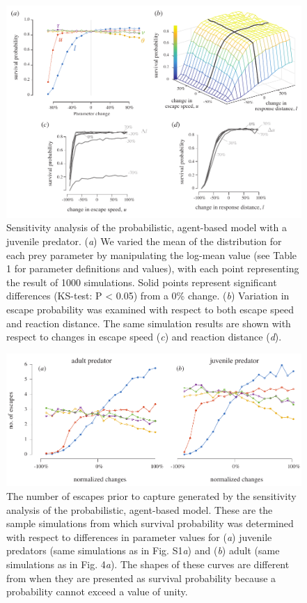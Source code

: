 \documentclass[11pt]{article}
\begin{document}
\linespread{1}\selectfont %


\begin{figure}[!h]
\centering
	\includegraphics[width=5.5in]{supp_sense}
\caption{Sensitivity analysis of the probabilistic, agent-based model with a juvenile predator. 
(\textit{a}) We varied the mean of the distribution for each prey parameter by manipulating the log-mean value (see Table 1 for parameter definitions and values), with each point representing the result of 1000 simulations. 
Solid points represent significant differences (KS-test: P < 0.05) from a 0\% change.
(\textit{b}) Variation in escape probability was examined with respect to both escape speed and reaction distance.
The same simulation results are shown with respect to changes in escape speed (\textit{c}) and reaction distance (\textit{d}).
}
\label{fig_sense}
\end{figure}

\begin{figure}[!h]
\centering
	\includegraphics[width=5.5in]{supp_noescape}
\caption{The number of escapes prior to capture generated by the sensitivity analysis of the probabilistic, agent-based model.
These are the sample simulations from which survival probability was determined with respect to differences in parameter values for (\textit{a}) juvenile predators (same simulations as in Fig. S1\textit{a}) and (\textit{b}) adult (same simulations as in Fig. 4\textit{a}).
The shapes of these curves are different from when they are presented as survival probability because a probability cannot exceed a value of unity.
}
\label{fig_sense}
\end{figure}
\end{document}
